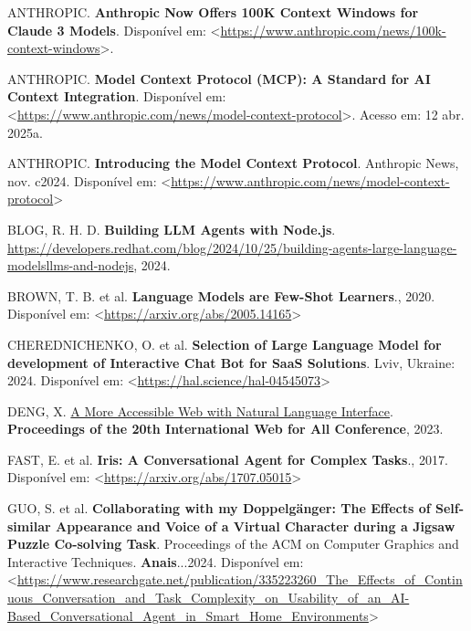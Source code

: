 \documentclass[
]{article}
\newlength{\cslhangindent}
\newenvironment{CSLReferences}[2] %
 {\begin{list}{}{%
  \setlength{\itemindent}{0pt}
  \setlength{\leftmargin}{0pt}
  \setlength{\parsep}{0pt}
  \ifodd #1
   \setlength{\leftmargin}{\cslhangindent}
   \setlength{\itemindent}{-1\cslhangindent}
  \fi
  \setlength{\itemsep}{#2\baselineskip}}}
 {\end{list}}
\begin{document}
\label{refs}
\begin{CSLReferences}{0}{1}
ANTHROPIC. \textbf{Anthropic Now Offers 100K Context Windows for Claude
3 Models}. Disponível em:
\textless{}\url{https://www.anthropic.com/news/100k-context-windows}\textgreater.

ANTHROPIC. \textbf{Model Context Protocol (MCP): A Standard for AI
Context Integration}. Disponível em:
\textless{}\url{https://www.anthropic.com/news/model-context-protocol}\textgreater.
Acesso em: 12 abr. 2025a.

ANTHROPIC. \textbf{{Introducing the Model Context Protocol}}. Anthropic
News, nov. c2024. Disponível em:
\textless{}\url{https://www.anthropic.com/news/model-context-protocol}\textgreater{}

BLOG, R. H. D. \textbf{Building LLM Agents with Node.js}.
\url{https://developers.redhat.com/blog/2024/10/25/building-agents-large-language-modelsllms-and-nodejs},
2024.

BROWN, T. B. et al. \textbf{Language Models are Few-Shot Learners}.,
2020. Disponível em:
\textless{}\url{https://arxiv.org/abs/2005.14165}\textgreater{}

CHEREDNICHENKO, O. et al. \textbf{Selection of Large Language Model for
development of Interactive Chat Bot for SaaS Solutions}. Lviv, Ukraine:
2024. Disponível em:
\textless{}\url{https://hal.science/hal-04545073}\textgreater{}

DENG, X. \href{https://api.semanticscholar.org/CorpusID:258259387}{A
More Accessible Web with Natural Language Interface}.
\textbf{Proceedings of the 20th International Web for All Conference},
2023.

FAST, E. et al. \textbf{Iris: A Conversational Agent for Complex
Tasks}., 2017. Disponível em:
\textless{}\url{https://arxiv.org/abs/1707.05015}\textgreater{}

GUO, S. et al. \textbf{Collaborating with my Doppelgänger: The Effects
of Self-similar Appearance and Voice of a Virtual Character during a
Jigsaw Puzzle Co-solving Task}. Proceedings of the ACM on Computer
Graphics and Interactive Techniques. \textbf{Anais}...2024. Disponível
em:
\textless{}\url{https://www.researchgate.net/publication/335223260_The_Effects_of_Continuous_Conversation_and_Task_Complexity_on_Usability_of_an_AI-Based_Conversational_Agent_in_Smart_Home_Environments}\textgreater{}


\end{CSLReferences}
\end{document}
